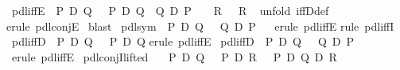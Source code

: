 \begin{isabellebody}
\ pdl{\isacharunderscore}iffE{\isacharcolon}\ {\isachardoublequote}{\isasymlbrakk}{\isasymturnstile}\ P\ {\isasymlongleftrightarrow}\isactrlsub D\ Q{\isacharsemicolon}\ {\isasymlbrakk}\ {\isasymturnstile}\ P\ {\isasymlongrightarrow}\isactrlsub D\ Q{\isacharsemicolon}\ {\isasymturnstile}\ Q\ {\isasymlongrightarrow}\isactrlsub D\ P\ {\isasymrbrakk}\ {\isasymLongrightarrow}\ {\isasymturnstile}\ R{\isasymrbrakk}\ {\isasymLongrightarrow}\ {\isasymturnstile}\ R{\isachardoublequote}\isanewline
\ \isamarkupfalse%
unfold\ iffD{\isacharunderscore}def{\isacharparenright}\ \isanewline
\ \isamarkupfalse%
erule\ pdl{\isacharunderscore}conjE{\isacharparenright}\isanewline
\isamarkupfalse%
\ blast\isanewline
\isanewline
\isamarkupfalse%
\ pdl{\isacharunderscore}sym{\isacharcolon}\ {\isachardoublequote}{\isacharparenleft}{\isasymturnstile}\ P\ {\isasymlongleftrightarrow}\isactrlsub D\ Q{\isacharparenright}\ {\isasymLongrightarrow}\ {\isacharparenleft}{\isasymturnstile}\ Q\ {\isasymlongleftrightarrow}\isactrlsub D\ P{\isacharparenright}{\isachardoublequote}\isanewline
\ \ \isamarkupfalse%
erule\ pdl{\isacharunderscore}iffE{\isacharparenright}\isanewline
\isamarkupfalse%
rule\ pdl{\isacharunderscore}iffI{\isacharparenright}\isanewline
\isanewline
\isamarkupfalse%
\ pdl{\isacharunderscore}iffD{}{\isacharcolon}\ {\isachardoublequote}{\isasymturnstile}\ P\ {\isasymlongleftrightarrow}\isactrlsub D\ Q\ {\isasymLongrightarrow}\ {\isasymturnstile}\ P\ {\isasymlongrightarrow}\isactrlsub D\ Q{\isachardoublequote}\isanewline
\isamarkupfalse%
erule\ pdl{\isacharunderscore}iffE{\isacharparenright}\isanewline
\isanewline
\isamarkupfalse%
\ pdl{\isacharunderscore}iffD{}{\isacharcolon}\ {\isachardoublequote}{\isasymturnstile}\ P\ {\isasymlongleftrightarrow}\isactrlsub D\ Q\ {\isasymLongrightarrow}\ {\isasymturnstile}\ Q\ {\isasymlongrightarrow}\isactrlsub D\ P{\isachardoublequote}\isanewline
\isamarkupfalse%
\ {\isacharparenleft}erule\ pdl{\isacharunderscore}iffE{\isacharparenright}\isanewline
\isanewline
\isamarkupfalse%
\ pdl{\isacharunderscore}conjI{\isacharunderscore}lifted{\isacharcolon}\ \isanewline
{}\ {\isachardoublequote}{\isasymturnstile}\ P\ {\isasymlongrightarrow}\isactrlsub D\ Q{\isachardoublequote}\ \ {\isachardoublequote}{\isasymturnstile}\ P\ {\isasymlongrightarrow}\isactrlsub D\ R{\isachardoublequote}\ \ {\isachardoublequote}{\isasymturnstile}\ P\ {\isasymlongrightarrow}\isactrlsub D\ Q\ {\isasymand}\isactrlsub D\ R{\isachardoublequote}\isanewline

\end{isabellebody}
